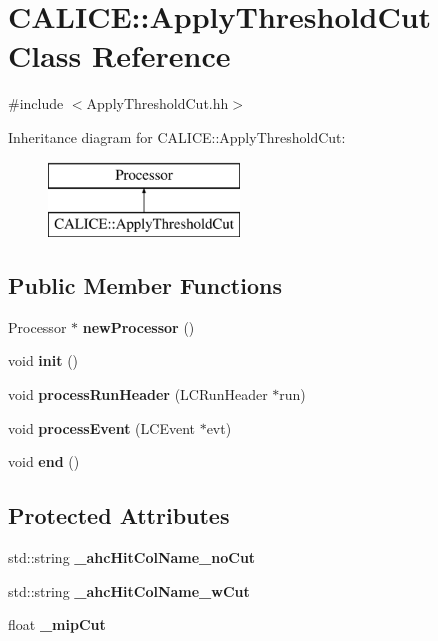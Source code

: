 \section{C\-A\-L\-I\-C\-E\-:\-:Apply\-Threshold\-Cut Class Reference}
\label{classCALICE_1_1ApplyThresholdCut}


{\ttfamily \#include $<$Apply\-Threshold\-Cut.\-hh$>$}

Inheritance diagram for C\-A\-L\-I\-C\-E\-:\-:Apply\-Threshold\-Cut\-:\begin{figure}[H]
\begin{center}
\leavevmode
\includegraphics[height=2.000000cm]{classCALICE_1_1ApplyThresholdCut}
\end{center}
\end{figure}
\subsection*{Public Member Functions}
\begin{DoxyCompactItemize}
\item 
Processor $\ast$ {\bfseries new\-Processor} ()\label{classCALICE_1_1ApplyThresholdCut_a186bcbb2561cf335e460c21bdc0eefe7}

\item 
void {\bf init} ()
\item 
void {\bf process\-Run\-Header} (L\-C\-Run\-Header $\ast$run)
\item 
void {\bf process\-Event} (L\-C\-Event $\ast$evt)
\item 
void {\bf end} ()
\end{DoxyCompactItemize}
\subsection*{Protected Attributes}
\begin{DoxyCompactItemize}
\item 
std\-::string {\bfseries \-\_\-ahc\-Hit\-Col\-Name\-\_\-no\-Cut}\label{classCALICE_1_1ApplyThresholdCut_a844fedf3de23644cf4db571eae6371aa}

\item 
std\-::string {\bfseries \-\_\-ahc\-Hit\-Col\-Name\-\_\-w\-Cut}\label{classCALICE_1_1ApplyThresholdCut_a1879defe52c594609139e00e879cad16}

\item 
float {\bfseries \-\_\-mip\-Cut}\label{classCALICE_1_1ApplyThresholdCut_ae80630b09af37e6284350c7a85ca4d0f}

\end{DoxyCompactItemize}


